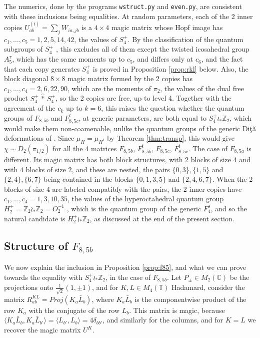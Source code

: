 \documentclass[11pt]{amsart}
\newcommand{\T}{\mathbb T}
\begin{document}
\noindent The numerics, done by the programs \texttt{wstruct.py} and \texttt{even.py}, are consistent with these inclusions being equalities. At random parameters, each of the 2 inner copies $U^{(i)}_{ab}=\sum_jW_{ia,jb}$ is a $4\times4$ magic matrix whose Hopf image has $c_1,\ldots,c_5=1,2,5,14,42$, the values of $S_4^+$. By the classification of the quantum subgroups of $S_4^+$ \cite{bb2}, this excludes all of them except the twisted icosahedral group $A_5^\tau$, which has the same moments up to $c_5$, and differs only at $c_6$, and the fact that each copy generates $S_4^+$ is proved in Proposition \ref{prop:rkl} below. Also, the block diagonal $8\times8$ magic matrix formed by the 2 copies has $c_1,\ldots,c_4=2,6,22,90$, which are the moments of $\pi_2$, the values of the dual free product $S_4^+\,\hat{*}\,S_4^+$, so the 2 copies are free, up to level 4. Together with the agreement of the $c_k$ up to $k=6$, this raises the question whether the quantum groups of $F_{8,5b}$ and $F_{8,5c}^t$, at generic parameters, are both equal to $S_4^+\wr_*\mathbb Z_2$, which would make them non-coamenable, unlike the quantum groups of the generic Di\c t\u a deformations of \cite{bb3}. Since $\mu_H=\mu_{H^t}$ by Theorem \ref{thm:transp}, this would give $\chi\sim D_2(\pi_{1/2})$ for all the 4 matrices $F_{8,5b}$, $F_{8,5b}^t$, $F_{8,5c}$, $F_{8,5c}^t$. The case of $F_{8,5a}$ is different. Its magic matrix has both block structures, with 2 blocks of size 4 and with 4 blocks of size 2, and these are nested, the pairs $\{0,3\},\{1,5\}$ and $\{2,4\},\{6,7\}$ being contained in the blocks $\{0,1,3,5\}$ and $\{2,4,6,7\}$. When the 2 blocks of size 4 are labeled compatibly with the pairs, the 2 inner copies have $c_1,\ldots,c_4=1,3,10,35$, the values of the hyperoctahedral quantum group $H_2^+=\mathbb Z_2\wr_*\mathbb Z_2=O_2^{-1}$ \cite{bbc}, which is the quantum group of the generic $F_4^s$, and so the natural candidate is $H_2^+\wr_*\mathbb Z_2$, as discussed at the end of the present section.

\medskip

\subsection{Structure of $F_{8,5b}$}

We now explain the inclusion in Proposition \ref{prop:f85}, and what we can prove towards the equality with $S_4^+\wr_*\mathbb Z_2$, in the case of $F_{8,5b}$. Let $P_\pm\in M_2(\mathbb C)$ be the projections onto $\frac{1}{\sqrt2}(1,\pm1)$, and for $K,L\in M_4(\T)$ Hadamard, consider the matrix $R^{KL}_{ab}=Proj(K_a\bar{L}_b)$, where $K_a\bar{L}_b$ is the componentwise product of the row $K_a$ with the conjugate of the row $L_b$. This matrix is magic, because $\langle K_a\bar{L}_b,K_a\bar{L}_{b'}\rangle=\langle L_{b'},L_b\rangle=4\delta_{bb'}$, and similarly for the columns, and for $K=L$ we recover the magic matrix $U^K$.
\end{document}
